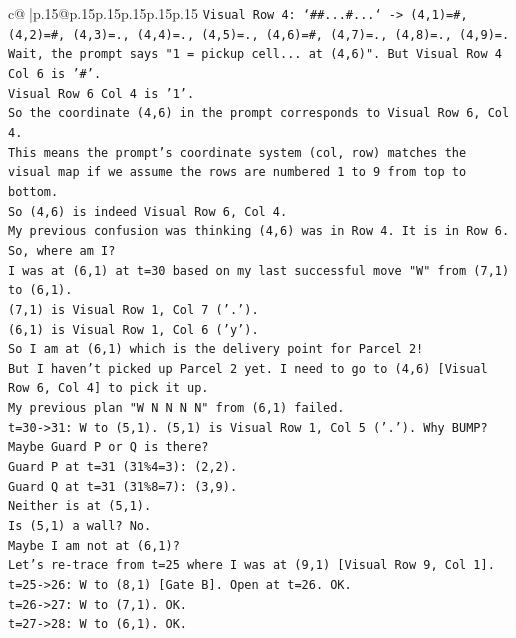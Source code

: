 \documentclass{article}
\begin{document}
{\begin{supertabular}{c@{$\;$}|p{.15\linewidth}@{}p{.15\linewidth}p{.15\linewidth}p{.15\linewidth}p{.15\linewidth}p{.15\linewidth}}
{{{\texttt{Visual Row 4: `\#\#...\#...` {-}> (4,1)=\#, (4,2)=\#, (4,3)=., (4,4)=., (4,5)=., (4,6)=\#, (4,7)=., (4,8)=., (4,9)=.} \\
\texttt{Wait, the prompt says "1 = pickup cell... at (4,6)". But Visual Row 4 Col 6 is '\#'.} \\
\texttt{Visual Row 6 Col 4 is '1'.} \\
\texttt{So the coordinate (4,6) in the prompt corresponds to Visual Row 6, Col 4.} \\
\texttt{This means the prompt's coordinate system (col, row) matches the visual map if we assume the rows are numbered 1 to 9 from top to bottom.} \\
\texttt{So (4,6) is indeed Visual Row 6, Col 4.} \\
\texttt{My previous confusion was thinking (4,6) was in Row 4. It is in Row 6.} \\
\texttt{So, where am I?} \\
\texttt{I was at (6,1) at t=30 based on my last successful move "W" from (7,1) to (6,1).} \\
\texttt{(7,1) is Visual Row 1, Col 7 ('.').} \\
\texttt{(6,1) is Visual Row 1, Col 6 ('y').} \\
\texttt{So I am at (6,1) which is the delivery point for Parcel 2!} \\
\texttt{But I haven't picked up Parcel 2 yet. I need to go to (4,6) {[}Visual Row 6, Col 4{]} to pick it up.} \\
\texttt{My previous plan "W N N N N" from (6,1) failed.} \\
\texttt{t=30{-}>31: W to (5,1). (5,1) is Visual Row 1, Col 5 ('.'). Why BUMP?} \\
\texttt{Maybe Guard P or Q is there?} \\
\texttt{Guard P at t=31 (31\%4=3): (2,2).} \\
\texttt{Guard Q at t=31 (31\%8=7): (3,9).} \\
\texttt{Neither is at (5,1).} \\
\texttt{Is (5,1) a wall? No.} \\
\texttt{Maybe I am not at (6,1)?} \\
\texttt{Let's re{-}trace from t=25 where I was at (9,1) {[}Visual Row 9, Col 1{]}.} \\
\texttt{t=25{-}>26: W to (8,1) {[}Gate B{]}. Open at t=26. OK.} \\
\texttt{t=26{-}>27: W to (7,1). OK.} \\
\texttt{t=27{-}>28: W to (6,1). OK.} \\
}}}
\end{supertabular}}
\end{document}
